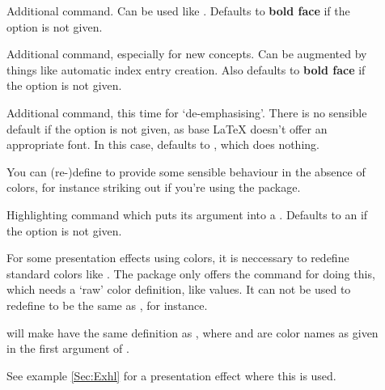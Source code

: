   \begin{description}
  \item[] Additional  command. Can be used like . Defaults
    to \textbf{bold face} if the  option is not given.
    
  \item[] Additional  command, especially for new concepts. Can be
    augmented by things like automatic index entry creation. Also defaults to \textbf{bold face} if the
     option is not given.
    
  \item[] Additional  command, this time for `de-emphasising'. There is
    no sensible default if the  option is not given, as base \LaTeX{} doesn't offer an appropriate
    font. In this case,  defaults to , which does nothing. 
    
    You can (re-)define  to provide some sensible behaviour in the absence of colors, for
    instance striking out if you're using the
    \href{ftp://ftp.dante.de/tex-archive/help/Catalogue/entries/soul.html}{} package.
  \end{description}


  \begin{description}
  \item[] Highlighting command which puts its argument into a . Defaults to an  if the  option is not given.
  \end{description}

\newslide

  \begin{description}
  \item[] For some presentation effects using
    colors, it is neccessary to redefine standard colors like . The  package only offers the
     command for doing this, which needs a `raw' color definition, like  values. It
    can not be used to redefine  to be the same as , for instance.
    
     will make  have the same definition as , where 
    and  are color names as given in the first argument of .

    See example \ref{Sec:Exhl} for a presentation effect where this is used.
  \end{description}


